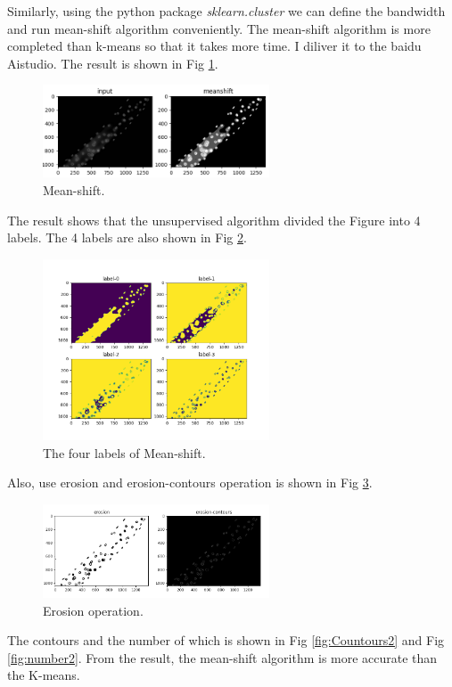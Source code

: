 \documentclass{article}
\begin{document}
Similarly, using the python package \emph{sklearn.cluster} we can define the bandwidth and run mean-shift algorithm conveniently. The mean-shift algorithm is more completed than k-means so that it takes more time. I diliver it to the baidu Aistudio. The result is shown in Fig \ref{fig:MsFigure_1}.
\begin{figure} [H]
\centering
\includegraphics[width=0.6\textwidth]{MsFigure_1.png}
\caption{\label{fig:MsFigure_1}Mean-shift.}
\end{figure}
The result shows that the unsupervised algorithm divided the Figure into 4 labels. The 4 labels are also shown in Fig \ref{fig:MsFigure_2}.
\begin{figure} [H]
\centering
\includegraphics[width=0.6\textwidth]{MsFigure_2.png}
\caption{\label{fig:MsFigure_2}The four labels of Mean-shift.}
\end{figure}
Also, use erosion and erosion-contours operation is shown in Fig \ref{fig:MsFigure_3}.
\begin{figure} [H]
\centering
\includegraphics[width=0.6\textwidth]{MsFigure_3.png}
\caption{\label{fig:MsFigure_3}Erosion operation.}
\end{figure}
The contours and the number of which is shown in Fig \ref{fig:Countours2} and Fig \ref{fig:number2}. From the result, the mean-shift  algorithm is more accurate than the K-means.
\end{document}
